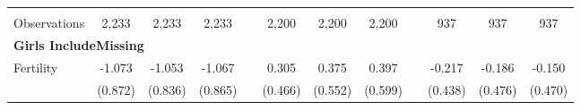 \begin{landscape}
\begin{table}[htpb!]
\begin{center}
\begin{tabular}{lcccp{2mm}cccp{2mm}ccc}
\begin{footnotesize}\end{footnotesize}&\begin{footnotesize}\end{footnotesize}&\begin{footnotesize}\end{footnotesize}&\begin{footnotesize}\end{footnotesize}&\begin{footnotesize}\end{footnotesize}&\begin{footnotesize}\end{footnotesize}&\begin{footnotesize}\end{footnotesize}&\begin{footnotesize}\end{footnotesize}&\begin{footnotesize}\end{footnotesize}&\begin{footnotesize}\end{footnotesize}&\begin{footnotesize}\end{footnotesize}&\begin{footnotesize}\end{footnotesize}\\Observations&2,233&2,233&2,233&&2,200&2,200&2,200&&937&937&937\\
\multicolumn{12}{l}{\textbf{Girls IncludeMissing}}\\ 
Fertility&-1.073&-1.053&-1.067&&0.305&0.375&0.397&&-0.217&-0.186&-0.150\\
&(0.872)&(0.836)&(0.865)&&(0.466)&(0.552)&(0.599)&&(0.438)&(0.476)&(0.470)\\

\end{tabular}
\end{center}
\end{table}
\end{landscape}

